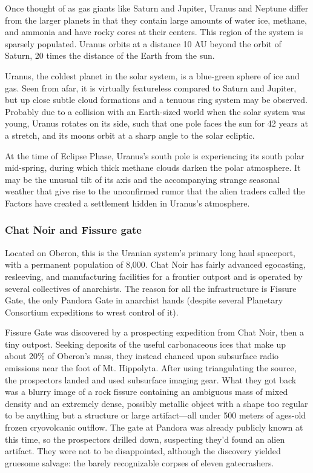 Once thought of as gas giants like Saturn and Jupiter, Uranus and Neptune differ from the larger planets in that they contain large amounts of water ice, methane, and ammonia and have rocky cores at their centers. This region of the system is sparsely populated. Uranus orbits at a distance 10 AU beyond the orbit of Saturn, 20 times the distance of the Earth from the sun. 

Uranus, the coldest planet in the solar system, is a blue-green sphere of ice and gas. Seen from afar, it is virtually featureless compared to Saturn and Jupiter, but up close subtle cloud formations and a tenuous ring system may be observed. Probably due to a collision with an Earth-sized world when the solar system was young, Uranus rotates on its side, such that one pole faces the sun for 42 years at a stretch, and its moons orbit at a sharp angle to the solar ecliptic. 

At the time of Eclipse Phase, Uranus's south pole is experiencing its south polar mid-spring, during which thick methane clouds darken the polar atmosphere. It may be the unusual tilt of its axis and the accompanying strange seasonal weather that give rise to the unconfirmed rumor that the alien traders called the Factors have created a settlement hidden in Uranus's atmosphere. 

\subsubsection{Chat Noir and Fissure gate}
\label{sec:chat-noir-fissure} 

Located on Oberon, this is the Uranian system's primary long haul spaceport, with a permanent population of 8,000. Chat Noir has fairly advanced egocasting, resleeving, and manufacturing facilities for a frontier outpost and is operated by several collectives of anarchists. The reason for all the infrastructure is Fissure Gate, the only Pandora Gate in anarchist hands (despite several Planetary Consortium expeditions to wrest control of it). 

Fissure Gate was discovered by a prospecting expedition from Chat Noir, then a tiny outpost. Seeking deposits of the useful carbonaceous ices that make up about 20\% of Oberon's mass, they instead chanced upon subsurface radio emissions near the foot of Mt. Hippolyta. After using triangulating the source, the prospectors landed and used subsurface imaging gear. What they got back was a blurry image of a rock fissure containing an ambiguous mass of mixed density and an extremely dense, possibly metallic object with a shape too regular to be anything but a structure or large artifact—all under 500 meters of ages-old frozen cryovolcanic outflow. The gate at Pandora was already publicly known at this time, so the prospectors drilled down, suspecting they'd found an alien artifact. They were not to be disappointed, although the discovery yielded gruesome salvage: the barely recognizable corpses of eleven gatecrashers. 

